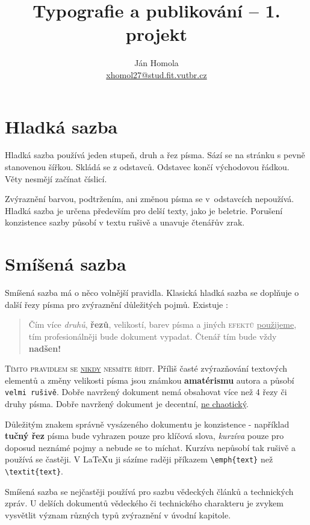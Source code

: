 \documentclass[a4paper, 10pt, twocolumn]{article}
\title{Typografie a publikování -- 1. projekt}
\author{Ján Homola \\ \href{mailto:xhomol27@stud.fit.vutbr.cz}{xhomol27@stud.fit.vutbr.cz}}
\date{}
\begin{document}
\maketitle

\section{Hladká sazba}
\label{section 1}
Hladká sazba používá jeden stupeň, druh a řez písma.
Sází se na stránku s pevně stanovenou šířkou.
Skládá se z odstavců. Odstavec končí východovou řádkou.
Věty nesmějí začínat číslicí.

Zvýraznění barvou, podtržením, ani změnou písma se v~odstavcích nepoužívá.
Hladká sazba je určena především pro delší texty, jako je beletrie.
Porušení konzistence sazby působí v textu rušivě a unavuje čtenářův zrak.

\section{Smíšená sazba}
\label{section 2}
Smíšená sazba má o něco volnější pravidla.
Klasická hladká sazba se doplňuje o další řezy písma pro zvýraznění důležitých pojmů.
Existuje :

\begin{quotation}
    Čím více \textit{druhů}, \textbf{řezů}, {\huge velikostí}, {\color{blue} barev} písma a jiných \textsc{\color{red} efektů} \underline{použijeme}, tím {\color{orange} profesionálněji} bude {\selectfont \Large dokument} vypadat.
    {\tiny Čtenář} tím bude vždy \textbf{\Huge nadšen!}
\end{quotation}

\textsc{Tímto pravidlem se \underline{nikdy} nesmíte řídit}.
Příliš časté zvýrazňování textových elementů a změny {\tiny velikosti} písma jsou známkou \textbf{amatérismu} autora a působí \texttt{velmi rušivě}.
Dobře navržený dokument nemá obsahovat více než 4 řezy či druhy písma.
Dobře navržený dokument je decentní, \underline{ne chaotický}.

Důležitým znakem správně vysázeného dokumentu je konzistence - například \textbf{tučný řez} písma bude vyhrazen pouze pro klíčová slova, \textit{kurzíva} pouze pro doposud neznámé pojmy a nebude se to míchat.
Kurzíva nepůsobí tak rušivě a používá se častěji.
V \LaTeX u ji sázíme raději příkazem  \verb|\emph{text}|  než \verb|\textit{text}|.

Smíšená sazba se nejčastěji používá pro sazbu vědeckých článků a technických zpráv.
U delších dokumentů vědeckého či technického charakteru je zvykem vysvětlit význam různých typů zvýraznění v úvodní kapitole.
\end{document}

